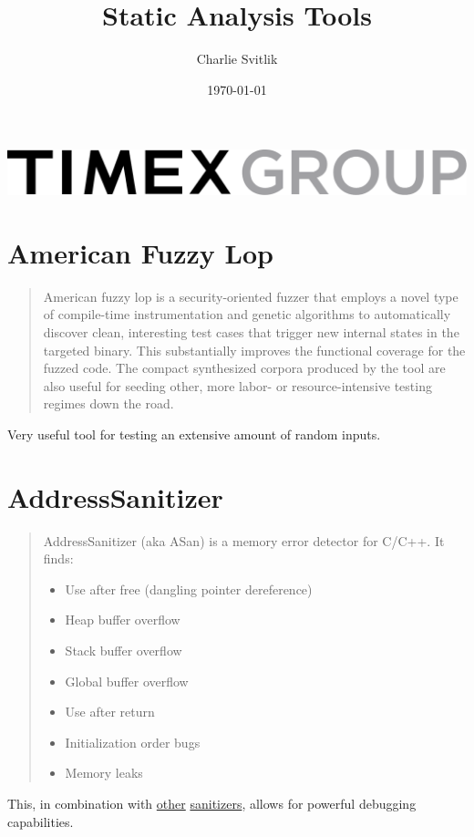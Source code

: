 \documentclass[12pt]{article}
\author{\Large Charlie Svitlik}
\date{\today}
\title{\Huge\bfseries Static Analysis Tools}
\begin{document}
\setlength{\voffset}{30ex}
\maketitle
\begin{center}
    \includegraphics[width=0.5\linewidth,page=1]{Timex_Group_Logo.pdf}%
\end{center}
\setlength{\voffset}{0pt}
\newpage
\tableofcontents
\newpage
\section{American Fuzzy Lop}
\begin{quote}
American fuzzy lop is a security-oriented fuzzer that employs a
novel type of compile-time instrumentation and genetic algorithms to
automatically discover clean, interesting test cases that trigger new
internal states in the targeted binary. This substantially improves
the functional coverage for the fuzzed code. The compact synthesized
corpora produced by the tool are also useful for seeding other,
more labor- or resource-intensive testing regimes down the road.
\end{quote}

Very useful tool for testing an extensive amount of random inputs.
\cite{afl}
\section{AddressSanitizer}
\begin{quote}
AddressSanitizer (aka ASan) is a memory error detector for C/C++. It finds:
\begin{itemize}
    \item Use after free (dangling pointer dereference)
    \item Heap buffer overflow
    \item Stack buffer overflow
    \item Global buffer overflow
    \item Use after return
    \item Initialization order bugs
    \item Memory leaks
\end{itemize}
\end{quote}

\label{asan}
This, in combination with \hyperref[msan]{other} \hyperref[tsan]{sanitizers},
allows for powerful debugging capabilities.
\cite{asan}
\end{document}
